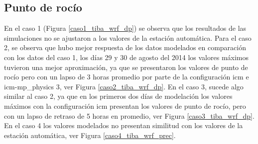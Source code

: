%


\subsection{Punto de rocío}

En el caso 1 (Figura \ref{caso1_tiba_wrf_dp}) se observa que los resultados de las simulaciones no se ajustaron a los valores de la estación automática. Para el caso 2, se observa que hubo mejor respuesta de los datos modelados en comparación con los datos del caso 1, los días 29 y 30 de agosto del 2014 los valores máximos tuvieron una mejor aproximación, ya que se presentaron los valores de punto de rocío pero con un lapso de 3 horas promedio por parte de la configuración icm e icm-mp\_physics 3, ver Figura \ref{caso2_tiba_wrf_dp}. En el caso 3, sucede algo similar al caso 2, ya que en los primeros dos días de modelación los valores máximos con la configuración icm presentan los valores de punto de rocío, pero con un lapso de retraso de 5 horas en promedio, ver Figura \ref{caso3_tiba_wrf_dp}. En el caso 4 los valores modelados no presentan similitud con los valores de la estación automática, ver Figura \ref{caso4_tiba_wrf_prec}.\\



